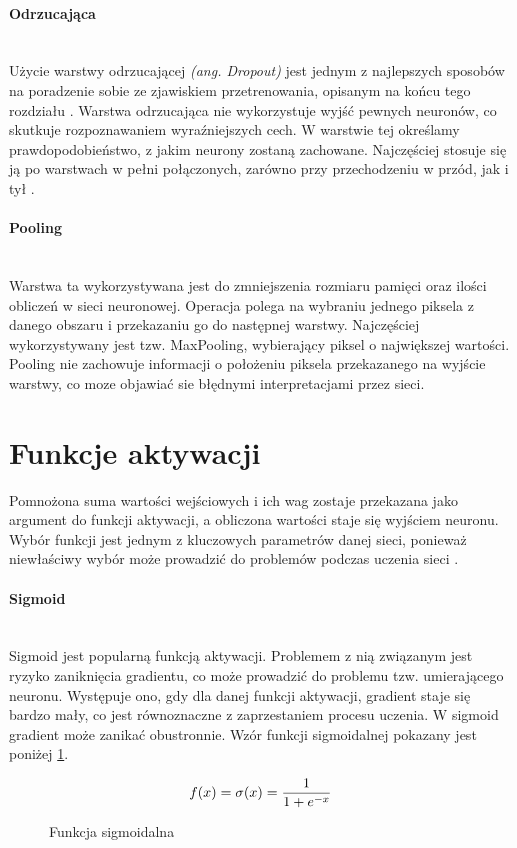 \paragraph{Odrzucająca} \mbox{}\\
Użycie warstwy odrzucającej \textit{(ang. Dropout)} jest jednym z najlepszych sposobów
na poradzenie sobie ze zjawiskiem przetrenowania, opisanym na końcu tego rozdziału
\cite{DropoutPreventOverfit}. Warstwa odrzucająca nie wykorzystuje wyjść pewnych neuronów,
co skutkuje rozpoznawaniem wyraźniejszych cech. W warstwie tej określamy prawdopodobieństwo,
z jakim neurony zostaną zachowane. Najczęściej stosuje się ją po warstwach w pełni
połączonych, zarówno przy przechodzeniu w przód, jak i tył \cite{DropConnect}.

\paragraph{Pooling} \mbox{}\\
Warstwa ta wykorzystywana jest do zmniejszenia rozmiaru pamięci oraz ilości obliczeń
w sieci neuronowej. Operacja polega na wybraniu jednego piksela z danego obszaru i przekazaniu
go do następnej warstwy. Najczęściej wykorzystywany jest tzw. MaxPooling, wybierający
piksel o największej wartości. Pooling nie zachowuje informacji o położeniu piksela przekazanego
na wyjście warstwy, co moze objawiać sie błędnymi interpretacjami przez sieci.

\section{Funkcje aktywacji}

Pomnożona suma wartości wejściowych i ich wag zostaje przekazana
jako argument do funkcji aktywacji, a obliczona wartości staje się wyjściem neuronu.
Wybór funkcji jest jednym z kluczowych parametrów danej sieci, ponieważ niewłaściwy wybór
może prowadzić do problemów podczas uczenia sieci \cite{activationFunctions, activationFunctionsV2}.

\paragraph{Sigmoid} \mbox{}\\
Sigmoid jest popularną funkcją aktywacji. Problemem z nią związanym
jest ryzyko zaniknięcia gradientu, co może prowadzić do problemu tzw. umierającego
neuronu. Występuje ono, gdy dla danej funkcji aktywacji,
gradient staje się bardzo mały, co jest równoznaczne z zaprzestaniem procesu uczenia.
W sigmoid gradient może zanikać obustronnie. Wzór funkcji sigmoidalnej pokazany jest poniżej \ref{eq:sigmoid}.
\begin{figure}[h!]
\renewcommand{\figurename}{Wzór}%
\begin{equation*}
f(x) = \sigma(x) = \frac{1}{1 + e^{-x}} \\
\end{equation*}
\caption{Funkcja sigmoidalna}
\label{eq:sigmoid}
\end{figure}

